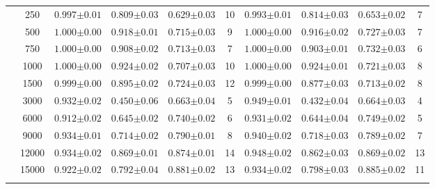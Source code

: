 \begin{table}[H]
\begin{tabularx}{\textwidth}{cc | YYYc | YYYc }
        & 250 & $0.997{\scriptscriptstyle\pm0.01}$ & $0.809{\scriptscriptstyle\pm0.03}$ & $0.629{\scriptscriptstyle\pm0.03}$ & 10 & $0.993{\scriptscriptstyle\pm0.01}$ & $0.814{\scriptscriptstyle\pm0.03}$ & $0.653{\scriptscriptstyle\pm0.02}$ & 7\\
        & 500 & $1.000{\scriptscriptstyle\pm0.00}$ & $0.918{\scriptscriptstyle\pm0.01}$ & $0.715{\scriptscriptstyle\pm0.03}$ & 9 & $1.000{\scriptscriptstyle\pm0.00}$ & $0.916{\scriptscriptstyle\pm0.02}$ & $0.727{\scriptscriptstyle\pm0.03}$ & 7\\
        & 750 & $1.000{\scriptscriptstyle\pm0.00}$ & $0.908{\scriptscriptstyle\pm0.02}$ & $0.713{\scriptscriptstyle\pm0.03}$ & 7 & $1.000{\scriptscriptstyle\pm0.00}$ & $0.903{\scriptscriptstyle\pm0.01}$ & $0.732{\scriptscriptstyle\pm0.03}$ & 6\\
        & 1000 & $1.000{\scriptscriptstyle\pm0.00}$ & $0.924{\scriptscriptstyle\pm0.02}$ & $0.707{\scriptscriptstyle\pm0.03}$ & 10 & $1.000{\scriptscriptstyle\pm0.00}$ & $0.924{\scriptscriptstyle\pm0.01}$ & $0.721{\scriptscriptstyle\pm0.03}$ & 8\\
        & 1500 & $0.999{\scriptscriptstyle\pm0.00}$ & $0.895{\scriptscriptstyle\pm0.02}$ & $0.724{\scriptscriptstyle\pm0.03}$ & 12 & $0.999{\scriptscriptstyle\pm0.00}$ & $0.877{\scriptscriptstyle\pm0.03}$ & $0.713{\scriptscriptstyle\pm0.02}$ & 8\\
        & 3000 & $0.932{\scriptscriptstyle\pm0.02}$ & $0.450{\scriptscriptstyle\pm0.06}$ & $0.663{\scriptscriptstyle\pm0.04}$ & 5 & $0.949{\scriptscriptstyle\pm0.01}$ & $0.432{\scriptscriptstyle\pm0.04}$ & $0.664{\scriptscriptstyle\pm0.03}$ & 4\\
        & 6000 & $0.912{\scriptscriptstyle\pm0.02}$ & $0.645{\scriptscriptstyle\pm0.02}$ & $0.740{\scriptscriptstyle\pm0.02}$ & 6 & $0.931{\scriptscriptstyle\pm0.02}$ & $0.644{\scriptscriptstyle\pm0.04}$ & $0.749{\scriptscriptstyle\pm0.02}$ & 5\\
        & 9000 & $0.934{\scriptscriptstyle\pm0.01}$ & $0.714{\scriptscriptstyle\pm0.02}$ & $0.790{\scriptscriptstyle\pm0.01}$ & 8 & $0.940{\scriptscriptstyle\pm0.02}$ & $0.718{\scriptscriptstyle\pm0.03}$ & $0.789{\scriptscriptstyle\pm0.02}$ & 7\\
        & 12000 & $0.934{\scriptscriptstyle\pm0.02}$ & $0.869{\scriptscriptstyle\pm0.01}$ & $0.874{\scriptscriptstyle\pm0.01}$ & 14 & $0.948{\scriptscriptstyle\pm0.02}$ & $0.862{\scriptscriptstyle\pm0.03}$ & $0.869{\scriptscriptstyle\pm0.02}$ & 13\\
        & 15000 & $0.922{\scriptscriptstyle\pm0.02}$ & $0.792{\scriptscriptstyle\pm0.04}$ & $0.881{\scriptscriptstyle\pm0.02}$ & 13 & $0.934{\scriptscriptstyle\pm0.02}$ & $0.798{\scriptscriptstyle\pm0.03}$ & $0.885{\scriptscriptstyle\pm0.02}$ & 11\\
         \\
    \end{tabularx}
\end{table}

